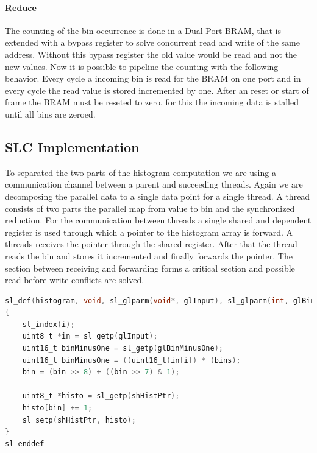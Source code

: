 \documentclass[a4paper]{scrartcl}
\begin{document}
\paragraph{Reduce}

The counting of the bin occurrence is done in a Dual Port BRAM, that is extended with a bypass register to solve concurrent read and write of the same address. Without this bypass register the old value would be read and not the new values. Now it is possible to pipeline the counting with the following behavior. Every cycle a incoming bin is read for the BRAM on one port and in every cycle the read value is stored incremented by one. After an reset or start of frame the BRAM must be reseted to zero, for this the incoming data is stalled until all bins are zeroed.


\subsection{SLC Implementation}
To separated the two parts of the histogram computation we are using a communication channel between a parent and succeeding threads. Again we are decomposing the parallel data to a single data point for a single thread. A thread consists of two parts the parallel map from value to bin and the synchronized reduction. For the communication between threads a single shared and dependent register is used through which a pointer to the histogram array is forward. A threads receives the pointer through the shared register. After that the thread reads the bin and stores it incremented and finally forwards the pointer. The section between receiving and forwarding forms a critical section and possible read before write conflicts are solved.

\begin{minipage}{\linewidth}
\begin{lstlisting}[language=C]
sl_def(histogram, void, sl_glparm(void*, glInput), sl_glparm(int, glBinMinusOne), sl_shparm(void*, shHistPtr))
{
	sl_index(i);
	uint8_t *in = sl_getp(glInput);
	uint16_t binMinusOne = sl_getp(glBinMinusOne);
	uint16_t binMinusOne = ((uint16_t)in[i]) * (bins);
	bin = (bin >> 8) + ((bin >> 7) & 1);
	
	uint8_t *histo = sl_getp(shHistPtr);
	histo[bin] += 1;
	sl_setp(shHistPtr, histo);
}
sl_enddef
\end{lstlisting}
\end{minipage}
\end{document}
